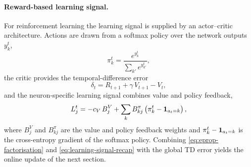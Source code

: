 \paragraph{Reward-based learning signal.}
For reinforcement learning the learning signal is supplied by an actor--critic
architecture. Actions are drawn from a softmax policy over the network outputs
$y^t_k$,
\begin{equation}
\pi^t_k = \frac{e^{y^t_k}}{\sum_{k'} e^{y^t_{k'}}},
\label{eq:softmax-recap}
\end{equation}
the critic provides the temporal-difference error
\begin{equation}
\delta_t = R_{t+1} + \gamma\, V_{t+1} - V_t,
\label{eq:tderror-recap}
\end{equation}
and the neuron-specific learning signal combines value and policy feedback,
\begin{equation}
L^t_j = - c_V\, B^V_j + \sum_k B^\pi_{kj}\left(\pi^t_k - \mathbbm{1}_{a_t = k}\right),
\label{eq:learning-signal-recap}
\end{equation}
where $B^V_j$ and $B^\pi_{kj}$ are the value and policy feedback weights and
$\pi^t_k - \mathbbm{1}_{a_t = k}$ is the cross-entropy gradient of the softmax
policy. Combining \eqref{eq:eprop-factorisation} and \eqref{eq:learning-signal-recap}
with the global TD error yields the online update of the next section.

